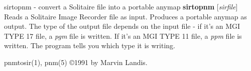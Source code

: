 sirtopnm - convert a Solitaire file into a portable anymap
{\bf sirtopnm}
{\rm [}{\it sirfile}{\rm ]}
Reads a Solitaire Image Recorder file as input.
Produces a portable anymap as output.
The type of the output file depends on the input file - if it's
an MGI TYPE 17 file, a
{\it pgm}
file is written. If it's an MGI TYPE 11 file, a
{\it ppm}
file is written.  The program tells you which type it is writing.

pnmtosir(1), pnm(5)
\copyright 1991 by Marvin Landis.

%
 
%

\newpage
%

